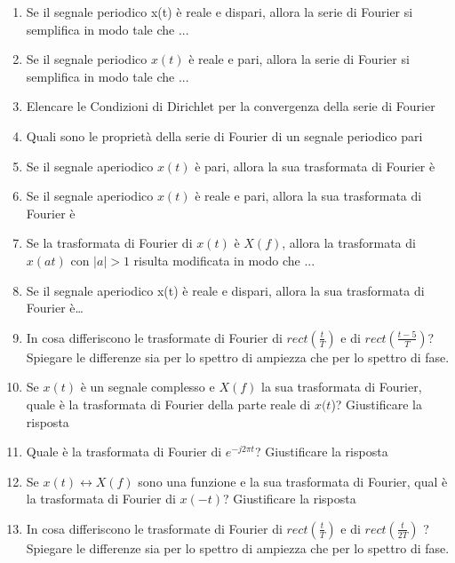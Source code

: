 \documentclass[
]{article}
\begin{document}
\begin{enumerate}
\item 
Se il segnale periodico x(t) è reale e dispari, allora la serie di Fourier si semplifica in modo tale che ...


\item 
Se il segnale periodico $x(t)$ è reale e pari, allora la serie di Fourier si semplifica in modo tale che ...


\item
Elencare le Condizioni di Dirichlet per la convergenza della serie di
Fourier

\item
Quali sono le proprietà della serie di Fourier di un segnale periodico
pari

\item 
Se il segnale aperiodico $x(t)$ è pari, allora la sua trasformata di Fourier è	



\item 
Se il segnale aperiodico $x(t)$ è reale e pari, allora la sua trasformata di Fourier è

\item 
Se la trasformata di Fourier di $x(t)$ è $X(f)$, allora la trasformata di $x(at)$ con $|a|>1$ risulta modificata in modo
che ...



\item
  Se il segnale aperiodico x(t) è reale e dispari, allora la sua
  trasformata di Fourier è\ldots{}
\item
  In cosa differiscono le trasformate di Fourier di
  \(rect (\frac{t}{T})\) e di \(rect (\frac{t-5}{T})\)? Spiegare le
  differenze sia per lo spettro di ampiezza che per lo spettro di fase.


\item
  Se \(x(t)\) è un segnale complesso e \(X(f)\) la sua trasformata di
  Fourier, quale è la trasformata di Fourier della parte reale di
  \(x(t\))? Giustificare la risposta
\item
  Quale è la trasformata di Fourier di $ e ^{-j2 \pi t}$?
  Giustificare la risposta
\item
  Se \(x(t) \leftrightarrow X(f)\) sono una funzione e la sua
  trasformata di Fourier, qual è la trasformata di Fourier di \(x(-t)\)?
  Giustificare la risposta






\item
  In cosa differiscono le trasformate di Fourier di $rect(\frac{t}{T})$ e
  di $rect(\frac{t}{2T})$ ? Spiegare le differenze sia per lo spettro di
  ampiezza che per lo spettro di fase.



\end{enumerate}
\end{document}
